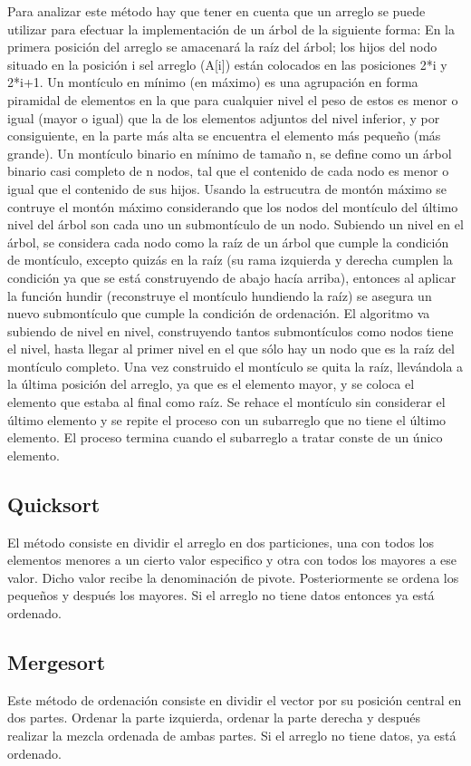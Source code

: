 \documentclass[12pt]{article}
\begin{document}
Para analizar este m\'etodo hay que tener en cuenta que un arreglo se puede utilizar para efectuar la implementaci\'on de un \'arbol de la siguiente forma:
En la primera posici\'on del arreglo se amacenar\'a la ra\'{i}z del \'arbol; los hijos del nodo situado en la posici\'on i sel arreglo (A[i]) est\'an colocados en las posiciones 2*i y 2*i+1. Un mont\'{i}culo en m\'{i}nimo (en m\'aximo) es una agrupaci\'on en forma piramidal de elementos en la que para cualquier nivel el peso de estos es menor o igual (mayor o igual) que la de los elementos adjuntos del nivel inferior, y por consiguiente, en la parte m\'as alta se encuentra el elemento m\'as pequeño (m\'as grande). Un mont\'{i}culo binario en m\'{i}nimo de tama\~no n, se define como un \'arbol binario casi completo de n nodos, tal que el contenido de cada nodo es menor o igual que el contenido de sus hijos.
Usando la estrucutra de mont\'on m\'aximo se contruye el mont\'on m\'aximo considerando que los nodos del mont\'{i}culo del \'ultimo nivel del \'arbol son cada uno un submont\'{i}culo de un nodo. Subiendo un nivel en el \'arbol, se considera cada nodo como la ra\'{i}z de un \'arbol que cumple la condici\'on de mont\'{i}culo, excepto quiz\'as en la ra\'{i}z (su rama izquierda y derecha cumplen la condici\'on ya que se est\'a construyendo de abajo hac\'{i}a arriba), entonces al aplicar la funci\'on hundir (reconstruye el mont\'{i}culo hundiendo la ra\'{i}z) se asegura un nuevo submont\'{i}culo que cumple la condici\'on de ordenaci\'on. El algoritmo va subiendo de nivel en nivel, construyendo tantos submont\'{i}culos como nodos tiene el nivel, hasta llegar al primer nivel en el que s\'olo hay un nodo que es la ra\'{i}z del mont\'{i}culo completo.
Una vez construido el mont\'{i}culo se quita la ra\'{i}z, llev\'andola a la \'ultima posici\'on del arreglo, ya que es el elemento mayor, y se coloca el elemento que estaba al final como ra\'{i}z. Se rehace el mont\'{i}culo sin considerar el \'ultimo elemento y se repite el proceso con un subarreglo que no tiene el \'ultimo elemento. El proceso termina cuando el subarreglo a tratar conste de un \'unico elemento. 

\subsection{Quicksort}

El m\'etodo consiste en dividir el arreglo en dos particiones, una con todos los elementos menores a un cierto valor especifico y otra con todos los mayores a ese valor. Dicho valor recibe la denominaci\'on de pivote. Posteriormente se ordena los pequeños y despu\'es los mayores. Si el arreglo no tiene datos entonces ya está ordenado.

\subsection{Mergesort}

Este m\'etodo de ordenaci\'on consiste en dividir el vector por su posici\'on central en dos partes. Ordenar la parte izquierda, ordenar la parte derecha y despu\'es realizar la mezcla ordenada de ambas partes. Si el arreglo no tiene datos, ya está ordenado.
\end{document}
